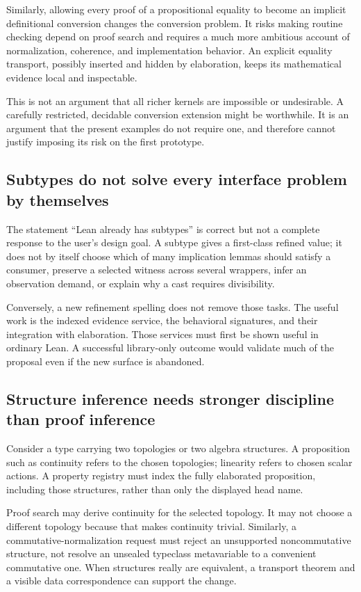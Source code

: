 \documentclass[11pt,letterpaper]{article}
\theoremstyle{definition}
\theoremstyle{remark}
\begin{document}
Similarly, allowing every proof of a propositional equality to become an
implicit definitional conversion changes the conversion problem. It risks
making routine checking depend on proof search and requires a much more
ambitious account of normalization, coherence, and implementation behavior.
An explicit equality transport, possibly inserted and hidden by elaboration,
keeps its mathematical evidence local and inspectable.

This is not an argument that all richer kernels are impossible or undesirable.
A carefully restricted, decidable conversion extension might be worthwhile.
It is an argument that the present examples do not require one, and therefore
cannot justify imposing its risk on the first prototype.

\subsection{Subtypes do not solve every interface problem by themselves}
The statement ``Lean already has subtypes'' is correct but not a complete
response to the user's design goal. A subtype gives a first-class refined
value; it does not by itself choose which of many implication lemmas should
satisfy a consumer, preserve a selected witness across several wrappers, infer
an observation demand, or explain why a cast requires divisibility.

Conversely, a new refinement spelling does not remove those tasks. The useful
work is the indexed evidence service, the behavioral signatures, and their
integration with elaboration. Those services must first be shown useful in
ordinary Lean. A successful library-only outcome would validate much of the
proposal even if the new surface is abandoned.

\subsection{Structure inference needs stronger discipline than proof inference}
Consider a type carrying two topologies or two algebra structures. A proposition
such as continuity refers to the chosen topologies; linearity refers to chosen
scalar actions. A property registry must index the fully elaborated proposition,
including those structures, rather than only the displayed head name.

Proof search may derive continuity for the selected topology. It may not choose
a different topology because that makes continuity trivial. Similarly, a
commutative-normalization request must reject an unsupported noncommutative
structure, not resolve an unsealed typeclass metavariable to a convenient
commutative one. When structures really are equivalent, a transport theorem
and a visible data correspondence can support the change.
\end{document}
